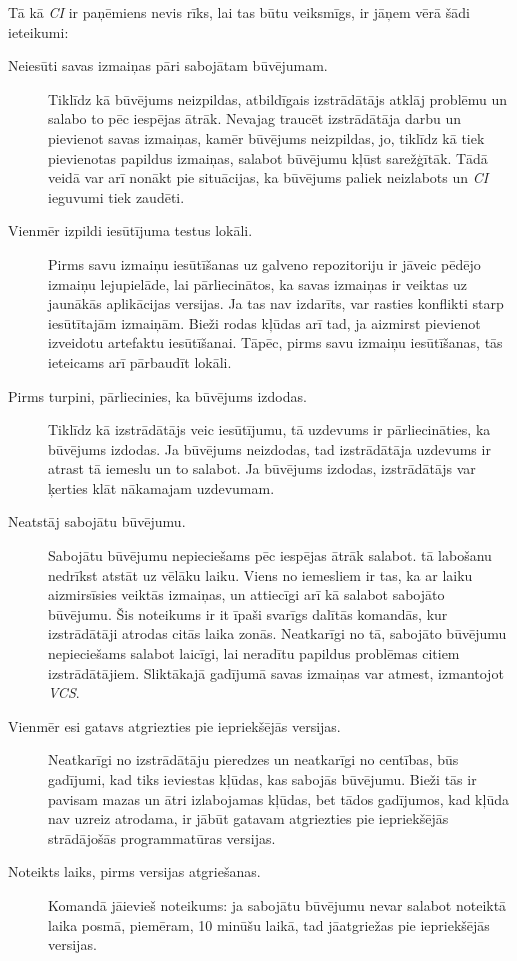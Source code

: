 Tā kā \textit{CI} ir paņēmiens nevis rīks, lai tas būtu veiksmīgs, ir jāņem vērā šādi ieteikumi:
\begin{description}
	\item [Neiesūti savas izmaiņas pāri sabojātam būvējumam.] Tiklīdz kā būvējums neizpildas, atbildīgais izstrādātājs atklāj problēmu un salabo to pēc iespējas ātrāk. Nevajag traucēt izstrādātāja darbu un pievienot savas izmaiņas, kamēr būvējums neizpildas, jo, tiklīdz kā tiek pievienotas papildus izmaiņas, salabot būvējumu kļūst sarežģītāk. Tādā veidā var arī nonākt pie situācijas, ka būvējums paliek neizlabots un \textit{CI} ieguvumi tiek zaudēti.
	\item [Vienmēr izpildi iesūtījuma testus lokāli.] Pirms savu izmaiņu iesūtīšanas uz galveno repozitoriju ir jāveic pēdējo izmaiņu lejupielāde, lai pārliecinātos, ka savas izmaiņas ir veiktas uz jaunākās aplikācijas versijas. Ja tas nav izdarīts, var rasties konflikti starp iesūtītajām izmaiņām. Bieži rodas kļūdas arī tad, ja aizmirst pievienot izveidotu artefaktu iesūtīšanai. Tāpēc, pirms savu izmaiņu iesūtīšanas, tās ieteicams arī pārbaudīt lokāli.
	\item [Pirms turpini, pārliecinies, ka būvējums izdodas.] Tiklīdz kā izstrādātājs veic iesūtījumu, tā uzdevums ir pārliecināties, ka būvējums izdodas. Ja būvējums neizdodas, tad izstrādātāja uzdevums ir atrast tā iemeslu un to salabot. Ja būvējums izdodas, izstrādātājs var ķerties klāt nākamajam uzdevumam.
	\item [Neatstāj sabojātu būvējumu.] Sabojātu būvējumu nepieciešams pēc iespējas ātrāk salabot. tā labošanu nedrīkst atstāt uz vēlāku laiku. Viens no iemesliem ir tas, ka ar laiku aizmirsīsies veiktās izmaiņas, un attiecīgi arī kā salabot sabojāto būvējumu. Šis noteikums ir it īpaši svarīgs dalītās komandās, kur izstrādātāji atrodas citās laika zonās. Neatkarīgi no tā, sabojāto būvējumu nepieciešams salabot laicīgi, lai neradītu papildus problēmas citiem izstrādātājiem. Sliktākajā gadījumā savas izmaiņas var atmest, izmantojot \textit{VCS}.
	\item [Vienmēr esi gatavs atgriezties pie iepriekšējās versijas.] Neatkarīgi no izstrādātāju pieredzes un neatkarīgi no centības, būs gadījumi, kad tiks ieviestas kļūdas, kas sabojās būvējumu. Bieži tās ir pavisam mazas un ātri izlabojamas kļūdas, bet tādos gadījumos, kad kļūda nav uzreiz atrodama, ir jābūt gatavam atgriezties pie iepriekšējās strādājošās programmatūras versijas.
	\item [Noteikts laiks, pirms versijas atgriešanas.] Komandā jāievieš noteikums: ja sabojātu būvējumu nevar salabot noteiktā laika posmā, piemēram, 10 minūšu laikā, tad jāatgriežas pie iepriekšējās versijas.

\end{description}
